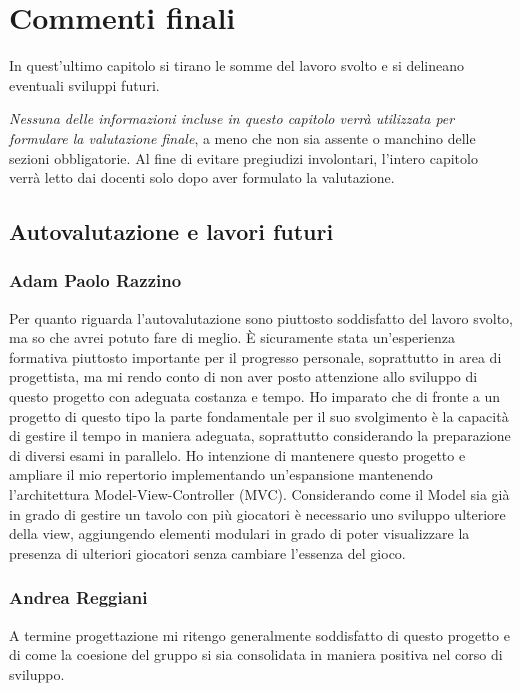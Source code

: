 \documentclass[a4paper,12pt]{report}
\begin{document}
\chapter{Commenti finali}

In quest'ultimo capitolo si tirano le somme del lavoro svolto e si delineano eventuali sviluppi
futuri.

\textit{Nessuna delle informazioni incluse in questo capitolo verrà utilizzata per formulare la valutazione finale}, a meno che non sia assente o manchino delle sezioni obbligatorie.
%
Al fine di evitare pregiudizi involontari, l'intero capitolo verrà letto dai docenti solo dopo aver formulato la valutazione.

\section{Autovalutazione e lavori futuri}

\subsection{Adam Paolo Razzino}
Per quanto riguarda l'autovalutazione sono piuttosto soddisfatto del lavoro svolto, ma so che avrei potuto fare di meglio. È sicuramente stata un'esperienza formativa piuttosto importante per il progresso personale, soprattutto in area di progettista, ma mi rendo conto di non aver posto attenzione allo sviluppo di questo progetto con adeguata costanza e tempo. Ho imparato che di fronte a un progetto di questo tipo la parte fondamentale per il suo svolgimento è la capacità di gestire il tempo in maniera adeguata, soprattutto considerando la preparazione di diversi esami in parallelo. 
Ho intenzione di mantenere questo progetto e ampliare il mio repertorio implementando un'espansione mantenendo l'architettura Model-View-Controller (MVC). Considerando come il Model sia già in grado di gestire un tavolo con più giocatori è necessario uno sviluppo ulteriore della view, aggiungendo elementi modulari in grado di poter visualizzare la presenza di ulteriori giocatori senza cambiare l'essenza del gioco.

\subsection{Andrea Reggiani}
A termine progettazione mi ritengo generalmente soddisfatto di questo progetto e di come la coesione del gruppo si sia consolidata in maniera positiva nel corso di sviluppo.
\end{document}
